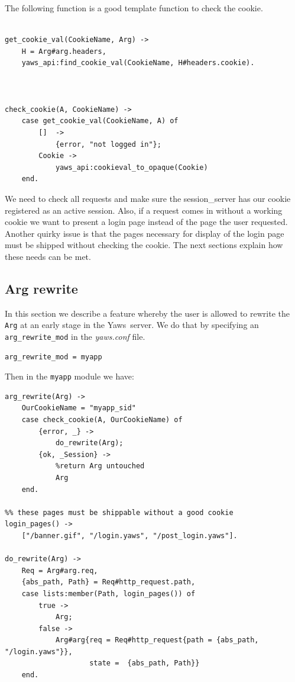 \documentclass[11pt,oneside,english]{book}
\newcommand{\Yaws}            %
        {{\sc Yaws}}
\begin{document}
The following function is a good template function to check the
cookie.

\begin{verbatim}

get_cookie_val(CookieName, Arg) ->
    H = Arg#arg.headers,
    yaws_api:find_cookie_val(CookieName, H#headers.cookie).



check_cookie(A, CookieName) ->
    case get_cookie_val(CookieName, A) of
        []  ->
            {error, "not logged in"};
        Cookie ->
            yaws_api:cookieval_to_opaque(Cookie)
    end.

\end{verbatim}

We need to check all requests and make sure the session\_server has
our cookie registered as an active session. Also, if a request comes
in without a working cookie we want to present a login page instead of
the page the user requested. Another quirky issue is that the pages
necessary for display of the login page must be shipped without
checking the cookie. The next sections explain how these needs can be
met.

\subsection{Arg rewrite}

In this section we describe a feature whereby the user is allowed to
rewrite the \verb+Arg+ at an early stage in the \Yaws\ server.  We do
that by specifying an \verb+arg_rewrite_mod+ in the \textit{yaws.conf}
file.

\begin{verbatim}
arg_rewrite_mod = myapp
\end{verbatim}


Then in the \verb+myapp+ module we have:

\begin{verbatim}
arg_rewrite(Arg) ->
    OurCookieName = "myapp_sid"
    case check_cookie(A, OurCookieName) of
        {error, _} ->
            do_rewrite(Arg);
        {ok, _Session} ->
            %return Arg untouched
            Arg
    end.

%% these pages must be shippable without a good cookie
login_pages() ->
    ["/banner.gif", "/login.yaws", "/post_login.yaws"].

do_rewrite(Arg) ->
    Req = Arg#arg.req,
    {abs_path, Path} = Req#http_request.path,
    case lists:member(Path, login_pages()) of
        true ->
            Arg;
        false ->
            Arg#arg{req = Req#http_request{path = {abs_path, "/login.yaws"}},
                    state =  {abs_path, Path}}
    end.

\end{verbatim}
\end{document}
